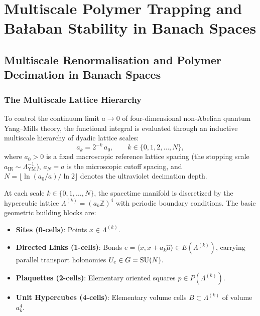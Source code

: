 \chapter{Multiscale Polymer Trapping and Ba\l aban Stability in Banach Spaces}
\label{ch:polymer}
\label{ch:polymer_fixed_point}

\section{Multiscale Renormalisation and Polymer Decimation in Banach Spaces}
\label{sec:multiscale_polymer_decimation}

\subsection{The Multiscale Lattice Hierarchy}
\label{subsec:multiscale_hierarchy_def}

To control the continuum limit $a \to 0$ of four-dimensional non-Abelian quantum Yang--Mills theory, the functional integral is evaluated through an inductive multiscale hierarchy of dyadic lattice scales:
\begin{equation}
\label{eq:ch14_dyadic_lattice_scales}
a_k = 2^{-k} \, a_0, \qquad k \in \{0, 1, 2, \dots, N\},
\end{equation}
where $a_0 > 0$ is a fixed macroscopic reference lattice spacing (the stopping scale $a_{\mathrm{IR}} \sim \Lambda_{\mathrm{YM}}^{-1}$), $a_N = a$ is the microscopic cutoff spacing, and $N = \lfloor \ln(a_0/a) / \ln 2 \rfloor$ denotes the ultraviolet decimation depth.

At each scale $k \in \{0, 1, \dots, N\}$, the spacetime manifold is discretized by the hypercubic lattice $\Lambda^{(k)} = (a_k \mathbb{Z})^4$ with periodic boundary conditions. The basic geometric building blocks are:
\begin{itemize}
    \item \textbf{Sites (0-cells)}: Points $x \in \Lambda^{(k)}$.
    \item \textbf{Directed Links (1-cells)}: Bonds $e = \langle x, x + a_k\hat{\mu} \rangle \in E(\Lambda^{(k)})$, carrying parallel transport holonomies $U_e \in G = \mathrm{SU}(N)$.
    \item \textbf{Plaquettes (2-cells)}: Elementary oriented squares $p \in P(\Lambda^{(k)})$.
    \item \textbf{Unit Hypercubes (4-cells)}: Elementary volume cells $B \subset \Lambda^{(k)}$ of volume $a_k^4$.
\end{itemize}

